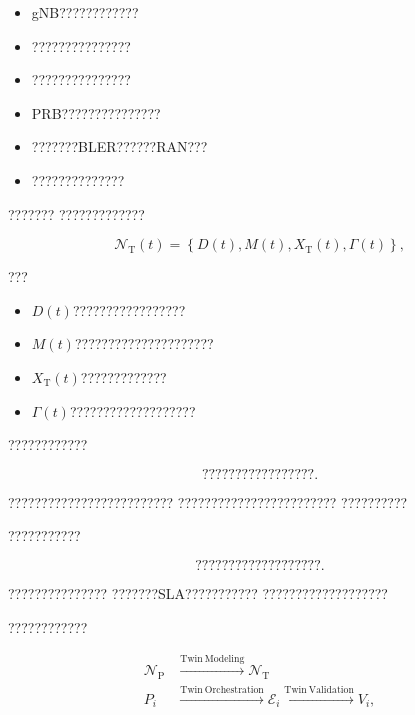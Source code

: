 \begin{itemize}
    \item gNB????????????
    \item ???????????????
    \item ???????????????
    \item PRB???????????????
    \item ???????BLER??????RAN???
    \item ??????????????
\end{itemize}

???????
?????????????

\begin{equation}
\mathcal{N}_{\mathrm{T}}(t)
=
\left\{
D(t),
M(t),
X_{\mathrm{T}}(t),
\Gamma(t)
\right\},
\label{eq:network_twin_composition}
\end{equation}

???

\begin{itemize}
    \item $D(t)$?????????????????
    \item $M(t)$?????????????????????
    \item $X_{\mathrm{T}}(t)$?????????????
    \item $\Gamma(t)$???????????????????
\end{itemize}

????????????

\begin{equation}
\text{?????????????????}.
\end{equation}

?????????????????????????
????????????????????????
??????????

???????????

\begin{equation}
\text{???????????????????}.
\end{equation}

???????????????
???????SLA???????????
???????????????????

????????????

\begin{equation}
\begin{aligned}
\mathcal{N}_{\mathrm{P}}
&\xrightarrow{\mathrm{Twin\ Modeling}}
\mathcal{N}_{\mathrm{T}}
\\
P_i
&\xrightarrow{\mathrm{Twin\ Orchestration}}
\mathcal{E}_i
\xrightarrow{\mathrm{Twin\ Validation}}
V_i,
\end{aligned}
\label{eq:modeling_orchestration_validation_relation}
\end{equation}


